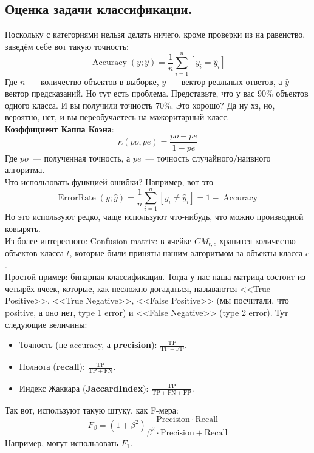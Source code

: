 \documentclass{article}
\begin{document}
    \subsection{Оценка задачи классификации.}
    Поскольку с категориями нельзя делать ничего, кроме проверки из на равенство, заведём себе вот такую точность:
    \[
    \operatorname{Accuracy}(y;\widehat y)=\frac1n\sum\limits_{i=1}^n[y_i=\widehat y_i]
    \]
    Где $n$~--- количество объектов в выборке, $y$~--- вектор реальных ответов, а $\widehat y$~--- вектор предсказаний. Но тут есть проблема. Представьте, что у вас 90\% объектов одного класса. И вы получили точность 70\%. Это хорошо? Да ну хз, но, вероятно, нет, и вы переобучаетесь на мажоритарный класс.\\
    \textbf{Коэффициент Каппа Коэна}:
    \[
    \kappa(po,pe)=\frac{po-pe}{1-pe}
    \]
    Где $po$~--- полученная точность, а $pe$~--- точность случайного/наивного алгоритма.\\
    Что использовать функцией ошибки? Например, вот это
    \[
    \operatorname{ErrorRate}(y;\widehat y)=\frac1n\sum\limits_{i=1}^n[y_i\neq\widehat y_i]=1-\operatorname{Accuracy}
    \]
    Но это используют редко, чаще используют что-нибудь, что можно производной ковырять.\\
    Из более интересного: Confusion matrix: в ячейке $CM_{t,c}$ хранится количество объектов класса $t$, которые были приняты нашим алгоритмом за объекты класса $c$.\\
    Простой пример: бинарная классификация. Тогда у нас наша матрица состоит из четырёх ячеек, которые, как несложно догадаться, называются <<True Positive>>, <<True Negative>>, <<False Positive>> (мы посчитали, что positive, а оно нет, type 1 error) и <<False Negative>> (type 2 error). Тут следующие величины:
    \begin{itemize}
        \item Точность (не accuracy, а \textbf{precision}): $\displaystyle\frac{\mathrm{TP}}{\mathrm{TP}+\mathrm{FP}}$.
        \item Полнота (\textbf{recall}): $\displaystyle\frac{\mathrm{TP}}{\mathrm{TP}+\mathrm{FN}}$.
        \item Индекс Жаккара (\textbf{JaccardIndex}): $\displaystyle\frac{\mathrm{TP}}{\mathrm{TP}+\mathrm{FN}+\mathrm{FP}}$.
    \end{itemize}
    Так вот, используют такую штуку, как F-мера:
    \[
    F_\beta=(1+\beta^2)\frac{\mathrm{Precision}\cdot\mathrm{Recall}}{\beta^2\cdot\mathrm{Precision}+\mathrm{Recall}}
    \]
    Например, могут использовать $F_1$.\\
\end{document}
